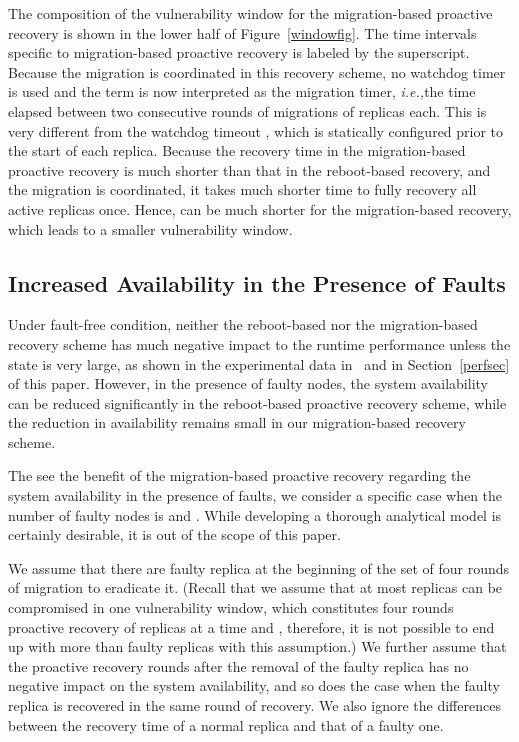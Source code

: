 \documentclass[times, 10pt, twocolumn]{article}
\newcommand{\ie}{{\it i.e.,}}
\begin{document}
The composition of the vulnerability window for the migration-based 
proactive recovery is shown in the lower half of Figure~\ref{windowfig}.
The time intervals specific to migration-based proactive recovery is labeled
by the  superscript. Because the migration is coordinated in this
recovery scheme, no watchdog timer is used and the term  is
now interpreted as the migration timer, \ie the time elapsed between
two consecutive rounds of migrations of  replicas each. This is
very different from the watchdog timeout , which is statically
configured prior to the start of each replica. Because the recovery time
in the migration-based proactive recovery is much shorter than that
in the reboot-based recovery, and the migration is coordinated,
it takes much shorter time to fully recovery all active replicas once.
Hence,  can be much shorter for the migration-based recovery,
which leads to a smaller vulnerability window.

\subsection{Increased Availability in the Presence of Faults}
Under fault-free condition, neither the reboot-based nor the migration-based
recovery scheme has much negative impact to the runtime performance unless
the state is very large, as shown in the experimental data in~\cite{bft-acm} 
and in Section~\ref{perfsec} of this paper. However, in the presence of faulty 
nodes, the system availability can be reduced significantly in the 
reboot-based proactive recovery scheme, while the reduction in availability 
remains small in our migration-based recovery scheme.

The see the benefit of the migration-based proactive recovery regarding
the system availability in the presence of faults, we consider a 
specific case when the number of faulty nodes is  and . 
While developing a thorough analytical model is certainly
desirable, it is out of the scope of this paper.

We assume that there are  faulty replica at the
beginning of the set of four rounds of migration to eradicate it.
(Recall that we assume that at most  replicas can be compromised
in one vulnerability window, which constitutes four rounds proactive
recovery of  replicas at a time and ,
therefore, it is not possible to end up with more than  faulty replicas
with this assumption.) We further assume that the proactive recovery
rounds after the removal of the faulty replica has no negative
impact on the system availability, and so does the case when the
faulty replica is recovered in the same round of recovery.
We also ignore the differences between
the recovery time of a normal replica and that of a faulty one.
\end{document}
